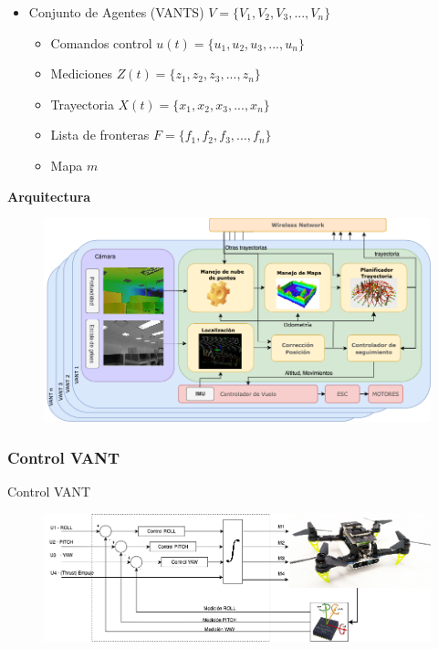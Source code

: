 \documentclass[
  24pt, %
  aspectratio=169, %
]{beamer}
\begin{document}
\begin{frame}
  
  \begin{itemize}
  \item Conjunto de Agentes (VANTS) $V = \{V_1,V_2,V_3,...,V_n\}$
    \bigskip %
    \begin{itemize}
    \item Comandos control $u(t) = \{u_1,u_2,u_3,...,u_n\}$
     \item Mediciones $Z(t) = \{z_1,z_2,z_3,...,z_n\}$
     \item Trayectoria  $X(t) = \{x_1,x_2,x_3,...,x_n\}$
     \item Lista de fronteras $F = \{f_1,f_2,f_3,...,f_n\}$
     \item Mapa $m$
    \end{itemize}
  \end{itemize}

  \bigskip %

  
\end{frame}

\begin{frame}
  \textbf{Arquitectura}
  \begin{figure}
    \centering
    \includegraphics[width=15cm]{arquitectura}
  \end{figure}
\end{frame}

\subsubsection{Control VANT}
\begin{frame}{Control VANT}
  \begin{figure}
    \centering
    \includegraphics[width=14cm]{drone_control}
  \end{figure}
\end{frame}
\end{document}
